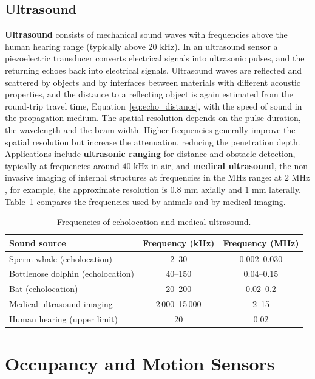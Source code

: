\documentclass[letterpaper,11pt,leqno]{book}
\begin{document}
\subsection{Ultrasound}

\textbf{Ultrasound} consists of mechanical sound waves with frequencies above the human hearing range (typically above $20\text{ kHz}$). In an ultrasound sensor a piezoelectric transducer converts electrical signals into ultrasonic pulses, and the returning echoes back into electrical signals. Ultrasound waves are reflected and scattered by objects and by interfaces between materials with different acoustic properties, and the distance to a reflecting object is again estimated from the round-trip travel time, Equation~\eqref{eq:echo_distance}, with the speed of sound in the propagation medium. The spatial resolution depends on the pulse duration, the wavelength and the beam width. Higher frequencies generally improve the spatial resolution but increase the attenuation, reducing the penetration depth. Applications include \textbf{ultrasonic ranging} for distance and obstacle detection, typically at frequencies around $40\text{ kHz}$ in air, and \textbf{medical ultrasound}, the non-invasive imaging of internal structures at frequencies in the MHz range: at $2\text{ MHz}$, for example, the approximate resolution is $0.8\text{ mm}$ axially and $1\text{ mm}$ laterally. Table~\ref{tab:sound_frequencies} compares the frequencies used by animals and by medical imaging.

\begin{table}[!htbp]
\centering
\caption{Frequencies of echolocation and medical ultrasound.}
\label{tab:sound_frequencies}
\begin{tabular*}{\textwidth}{l@{\extracolsep\fill}cc}
\toprule
Sound source & Frequency (kHz) & Frequency (MHz) \\
\midrule
Sperm whale (echolocation) & 2--30 & 0.002--0.030 \\
Bottlenose dolphin (echolocation) & 40--150 & 0.04--0.15 \\
Bat (echolocation) & 20--200 & 0.02--0.2 \\
Medical ultrasound imaging & 2\,000--15\,000 & 2--15 \\
Human hearing (upper limit) & 20 & 0.02 \\
\bottomrule
\end{tabular*}
\end{table}

\section{Occupancy and Motion Sensors}
\label{sec:occupancy}
\end{document}
